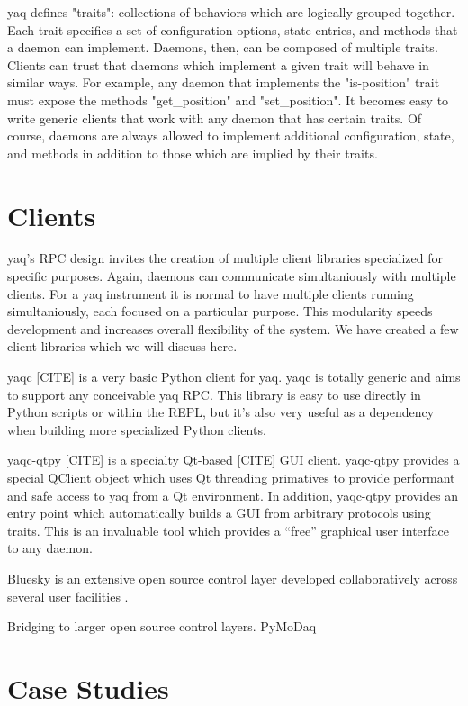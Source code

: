 \documentclass{article}
\begin{document}
yaq defines "traits": collections of behaviors which are logically grouped together.
Each trait specifies a set of configuration options, state entries, and methods that a daemon can implement.
Daemons, then, can be composed of multiple traits.
Clients can trust that daemons which implement a given trait will behave in similar ways.
For example, any daemon that implements the "is-position" trait must expose the methods "get\_position" and "set\_position".
It becomes easy to write generic clients that work with any daemon that has certain traits.
Of course, daemons are always allowed to implement additional configuration, state, and methods in addition to those which are implied by their traits.

\section{Clients}

yaq's RPC design invites the creation of multiple client libraries specialized for specific purposes.
Again, daemons can communicate simultaniously with multiple clients.
For a yaq instrument it is normal to have multiple clients running simultaniously, each focused on a particular purpose.
This modularity speeds development and increases overall flexibility of the system.
We have created a few client libraries which we will discuss here.

yaqc [CITE] is a very basic Python client for yaq.
yaqc is totally generic and aims to support any conceivable yaq RPC.
This library is easy to use directly in Python scripts or within the REPL, but it's also very useful as a dependency when building more specialized Python clients.

yaqc-qtpy [CITE] is a specialty Qt-based [CITE] GUI client.
yaqc-qtpy provides a special QClient object which uses Qt threading primatives to provide performant and safe access to yaq from a Qt environment.
In addition, yaqc-qtpy provides an entry point which automatically builds a GUI from arbitrary protocols using traits.
This is an invaluable tool which provides a ``free'' graphical user interface to any daemon.

Bluesky is an extensive open source control layer developed collaboratively across several user facilities \cite{AllanDanielB2019a}.

Bridging to larger open source control layers.
PyMoDaq \cite{WeberSebastien2021a}

\section{Case Studies}
\end{document}
